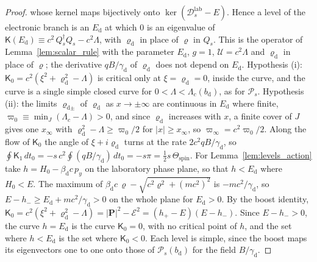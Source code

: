 \documentclass[aps,prd,onecolumn,tightenlines,nofootinbib,notitlepage,11pt,floatfix]{revtex4-2}
\theoremstyle{indentedtheorem}
\begin{document}
\begin{proof}
whose kernel maps bijectively onto $\ker(\mathcal{D}_s^\text{lab}-E)$. Hence a level of the electronic branch is an $E_\text{d}$ at which $0$ is an eigenvalue of $\mathsf{K}(E_\text{d})\equiv c^2\,Q_s^\dagger Q_s-c^2\Lambda$, with $\varrho_\text{d}$ in place of $\varrho$ in $Q_s$. This is the operator of Lemma~\ref{lem:scalar_rule} with the parameter $E_\text{d}$, $g=1$, $\mathcal{U}=c^2\Lambda$ and $\varrho_\text{d}$ in place of $\varrho$; the derivative $qB/\gamma_\text{d}$ of $\varrho_\text{d}$ does not depend on $E_\text{d}$. Hypothesis (i): $\mathsf{K}_0=c^2(\xi^2+\varrho_\text{d}^2-\Lambda)$ is critical only at $\xi=\varrho_\text{d}=0$, inside the curve, and the curve is a single simple closed curve for $0<\Lambda<\Lambda_c(b_\text{d})$, as for $\mathcal{P}_s$. Hypothesis (ii): the limits $\varrho_{\text{d}\pm}$ of $\varrho_\text{d}$ as $x\to\pm\infty$ are continuous in $E_\text{d}$ where finite, $\varpi_0\equiv\min_J(\Lambda_c-\Lambda)>0$, and since $\varrho_\text{d}$ increases with $x$, a finite cover of $J$ gives one $x_\infty$ with $\varrho_\text{d}^2-\Lambda\geq\varpi_0/2$ for $|x|\geq x_\infty$, so $\varpi_\infty=c^2\varpi_0/2$. Along the flow of $\mathsf{K}_0$ the angle of $\xi+i\varrho_\text{d}$ turns at the rate $2c^2qB/\gamma_\text{d}$, so $\oint\mathsf{K}_1\,dt_0=-s\,c^2\oint(qB/\gamma_\text{d})\,dt_0=-s\pi=\tfrac{1}{2}s\,\Theta_\text{spin}$. For Lemma~\ref{lem:levels_action} take $h=H_0-\beta_\text{d}c\,p_y$ on the laboratory phase plane, so that $h<E_\text{d}$ where $H_0<E$. The maximum of $\beta_\text{d}c\,\varrho-\sqrt{c^2\varrho^2+(mc^2)^2}$ is $-mc^2/\gamma_\text{d}$, so $E-h_-\geq E_\text{d}+mc^2/\gamma_\text{d}>0$ on the whole plane for $E_\text{d}>0$. By the boost identity, $\mathsf{K}_0=c^2(\xi^2+\varrho_\text{d}^2-\Lambda)=|\mathbf{P}|^2-\mathcal{E}^2=(h_+-E)(E-h_-)$. Since $E-h_->0$, the curve $h=E_\text{d}$ is the curve $\mathsf{K}_0=0$, with no critical point of $h$, and the set where $h<E_\text{d}$ is the set where $\mathsf{K}_0<0$. Each level is simple, since the boost maps its eigenvectors one to one onto those of $\mathcal{P}_s(b_\text{d})$ for the field $B/\gamma_\text{d}$.


\end{proof}
\end{document}
